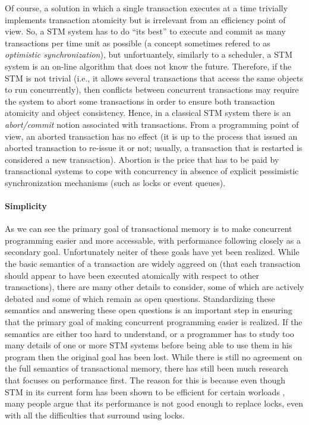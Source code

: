 Of course, a solution in which a single transaction  executes at a time
trivially implements transaction atomicity but is irrelevant from 
an efficiency point of view. So, a STM system has to do ``its best'' to 
execute and commit as many transactions  per time unit as possible
(a concept sometimes refered to as \emph{optimistic synchronization}), 
but unfortuantely, similarly to 
a scheduler, a STM system is an on-line algorithm that does not know 
the future. Therefore, if the STM is not trivial (i.e., it allows several transactions 
that access the same objects to run concurrently),  
then conflicts between concurrent transactions may require the system to abort some transactions in order 
to ensure both transaction  atomicity and object consistency.
Hence,  in  a
classical  STM system    there    is  an    {\it   abort/commit}    notion
associated   with transactions. 
From a programming point of view, an aborted transaction has no effect (it is 
up to the process that issued an aborted transaction to re-issue it or not; 
usually, a transaction that is restarted is considered  a new transaction). 
Abortion is   the price that has to  be paid by transactional  systems to cope 
with concurrency in  absence of explicit pessimistic synchronization mechanisms
(such as locks or event queues).



\paragraph{Simplicity}
As we can see the primary goal of transactional memory is to make concurrent programming
easier and more accessable, with performance following closely as a secondary goal.
Unfortunately neiter of these goals have yet been realized.
While the basic semantics of a transaction are widely aggreed on
(that each transaction should appear to have been executed atomically
with respect to other transactions), there are many other details to consider,
some of which are actively debated and some of which remain as open questions.
Standardizing these semantics and answering these open questions is an important
step in ensuring that the primary goal of making concurrent programming easier
is realized.
If the semantics are either too hard to understand, or a programmer has to study
too many details of one or more STM systems before being able to use them in
his program then the original goal has been lost.
While there is still no agreement on the full semantics of transactional memory,
there has still been much research that focuses on performance first.
The reason for this is because even though STM in its current form has been shown
to be efficient for certain worloads \cite{}, many people argue that
its performance is not good enough to replace locks, even with all the
difficulties that surround using locks.


